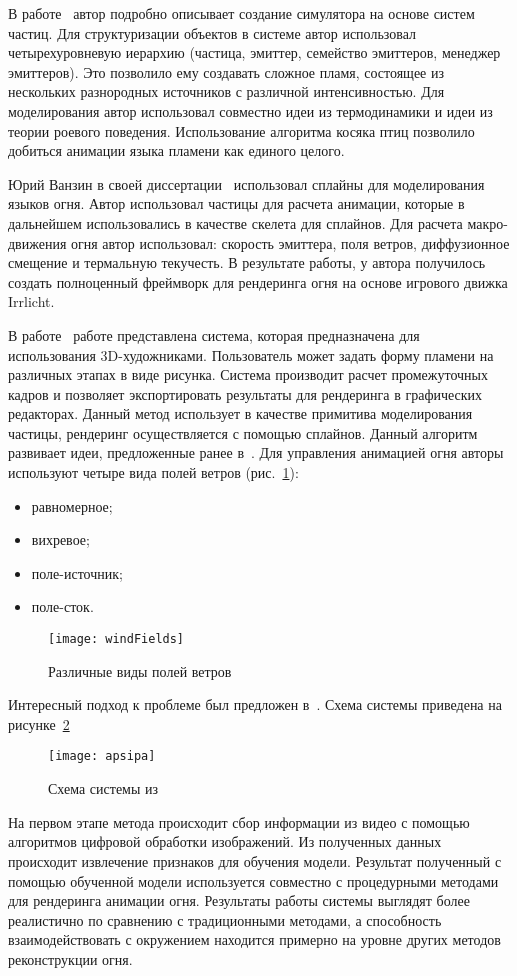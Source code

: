 В работе~\cite{Somasekaran2005UsingPS} автор подробно описывает создание
симулятора на основе систем частиц. Для структуризации объектов в системе автор
использовал четырехуровневую иерархию (частица, эмиттер, семейство эмиттеров,
менеджер эмиттеров). Это позволило ему создавать сложное пламя, состоящее из
нескольких разнородных источников с различной интенсивностью. Для моделирования
автор использовал совместно идеи из термодинамики и идеи из теории роевого
поведения. Использование алгоритма косяка птиц позволило добиться анимации языка
пламени как единого целого.

Юрий Ванзин в своей диссертации~\cite{Vanzine2007RealisticRR} использовал
сплайны для моделирования языков огня. Автор использовал частицы для расчета
анимации, которые в дальнейшем использовались в качестве скелета для сплайнов.
Для расчета макро-движения огня автор использовал: скорость эмиттера, поля
ветров, диффузионное смещение и термальную текучесть. В результате работы, у
автора получилось создать полноценный фреймворк для рендеринга огня на основе
игрового движка Irrlicht.

В работе~\cite{turbulence} работе представлена система, которая предназначена
для использования 3D-художниками. Пользователь может задать форму пламени на
различных этапах в виде рисунка. Система производит расчет промежуточных кадров
и позволяет экспортировать результаты для рендеринга в графических редакторах.
Данный метод использует в качестве примитива моделирования частицы, рендеринг
осуществляется с помощью сплайнов. Данный алгоритм развивает идеи, предложенные
ранее в~\cite{Vanzine2007RealisticRR}. Для управления анимацией огня авторы
используют четыре вида полей ветров (рис.~\ref{fig:windFields}):
\begin{itemize}
    \item равномерное;
    \item вихревое;
    \item поле-источник;
    \item поле-сток.
\end{itemize}
\begin{figure}[htb]
	\centering
	\texttt{[image: windFields]}
    \caption{Различные виды полей ветров}%
    \label{fig:windFields}
\end{figure}

Интересный подход к проблеме был предложен в~\cite{Lee2011ThreeDF}. Схема
системы приведена на рисунке~\ref{fig:apsipa}
\begin{figure}[htb]
	\centering
	\texttt{[image: apsipa]}
    \caption{Схема системы из~\cite{Lee2011ThreeDF}}%
    \label{fig:apsipa}
\end{figure}
На первом этапе метода происходит сбор информации из видео с помощью алгоритмов
цифровой обработки изображений. Из полученных данных происходит извлечение
признаков для обучения модели. Результат полученный с помощью обученной модели
используется совместно с процедурными методами для рендеринга анимации огня.
Результаты работы системы выглядят более реалистично по сравнению с
традиционными методами, а способность взаимодействовать с окружением находится
примерно на уровне других методов реконструкции огня.

